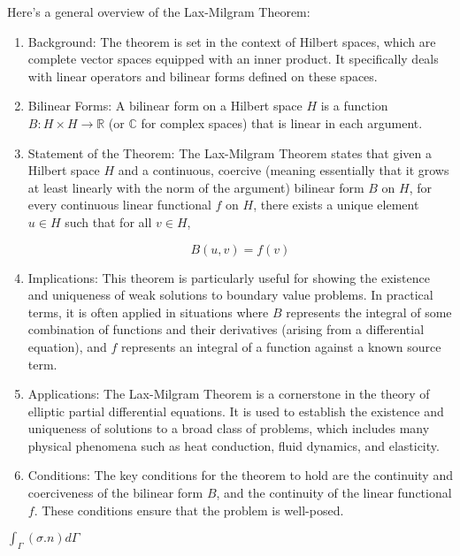 \documentclass[a4paper,12pt]{article} %
\begin{document}
Here's a general overview of the Lax-Milgram Theorem:
\begin{enumerate}

   \item Background: The theorem is set in the context of Hilbert spaces, which are complete vector spaces equipped with an inner product. It specifically deals with linear operators and bilinear forms defined on these spaces.

   \item Bilinear Forms: A bilinear form on a Hilbert space \( H \) is a function \( B: H \times H \rightarrow \mathbb{R} \) (or \( \mathbb{C} \) for complex spaces) that is linear in each argument.

   \item Statement of the Theorem: The Lax-Milgram Theorem states that given a Hilbert space \( H \) and a continuous, coercive (meaning essentially that it grows at least linearly with the norm of the argument) bilinear form \( B \) on \( H \), for every continuous linear functional \( f \) on \( H \), there exists a unique element \( u \in H \) such that for all \( v \in H \),
   
   \[ B(u, v) = f(v) \]

   \item Implications: This theorem is particularly useful for showing the existence and uniqueness of weak solutions to boundary value problems. In practical terms, it is often applied in situations where \( B \) represents the integral of some combination of functions and their derivatives (arising from a differential equation), and \( f \) represents an integral of a function against a known source term.

   \item Applications: The Lax-Milgram Theorem is a cornerstone in the theory of elliptic partial differential equations. It is used to establish the existence and uniqueness of solutions to a broad class of problems, which includes many physical phenomena such as heat conduction, fluid dynamics, and elasticity.

   \item Conditions: The key conditions for the theorem to hold are the continuity and coerciveness of the bilinear form \( B \), and the continuity of the linear functional \( f \). These conditions ensure that the problem is well-posed.
\end{enumerate}
$\int_\Gamma (\sigma . n) d\Gamma$
\end{document}
